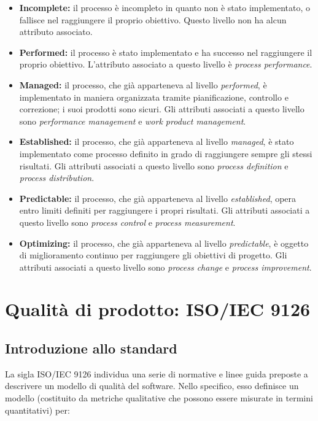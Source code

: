 \documentclass[openany,12pt,a4paper]{report}
\begin{document}
\begin{itemize}
    \item \textbf{Incomplete:} il processo è incompleto in quanto non è stato implementato, o fallisce nel raggiungere il proprio obiettivo. Questo livello non ha alcun attributo associato.
    \item \textbf{Performed:} il processo è stato implementato e ha successo nel raggiungere il proprio obiettivo. L'attributo associato a questo livello è \textit{process performance}.
    \item \textbf{Managed:} il processo, che già apparteneva al livello \textit{performed}, è implementato in maniera organizzata tramite pianificazione, controllo e correzione; i suoi prodotti sono sicuri. Gli attributi associati a questo livello sono \textit{performance management} e \textit{work product management}.
    \item \textbf{Established:} il processo, che già apparteneva al livello \textit{managed}, è stato implementato come processo definito in grado di raggiungere sempre gli stessi risultati. Gli attributi associati a questo livello sono \textit{process definition} e \textit{process distribution}.
    \item \textbf{Predictable:} il processo, che già apparteneva al livello \textit{established}, opera entro limiti definiti per raggiungere i propri risultati. Gli attributi associati a questo livello sono \textit{process control} e \textit{process measurement}.
    \item \textbf{Optimizing:} il processo, che già apparteneva al livello \textit{predictable}, è oggetto di miglioramento continuo per raggiungere gli obiettivi di progetto. Gli attributi associati a questo livello sono \textit{process change} e \textit{process improvement}.
\end{itemize}

    
\section{Qualità di prodotto: ISO/IEC 9126}    

\subsection{Introduzione allo standard}

La sigla ISO/IEC 9126 individua una serie di normative e linee guida preposte a descrivere un modello di qualità del software. Nello specifico, esso definisce un modello (costituito da metriche qualitative che possono essere misurate in termini quantitativi) per:
\end{document}
